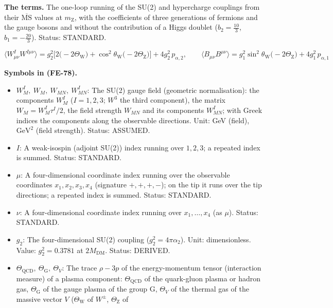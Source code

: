 \documentclass[
  10pt,
]{article}
\providecommand{\tightlist}{%
  \setlength{\itemsep}{0pt}\setlength{\parskip}{0pt}}
\begin{document}
\textbf{The terms.} The one-loop running of the SU(2) and hypercharge
couplings from their \(\overline{\mathrm{MS}}\) values at
\(m_{\mathrm{Z}}\), with the coefficients of three generations of
fermions and the gauge bosons and without the contribution of a Higgs
doublet (\(b_2 = \frac{10}{3}\), \(b_1 = -\frac{20}{3}\)). Status:
STANDARD.

\[
\big\langle W^I_{\mu\nu}W^{I\mu\nu}\big\rangle = g_2^2\Big[2\big(-2\Theta_{\mathrm{W}}\big)
 + \cos^2\theta_{\mathrm{W}}\big(-2\Theta_{\mathrm{Z}}\big)\Big] + 4g_2^2\,p_{\alpha,2},\qquad
\big\langle B_{\mu\nu}B^{\mu\nu}\big\rangle =
 g_1^2\sin^2\theta_{\mathrm{W}}\big(-2\Theta_{\mathrm{Z}}\big) + 4g_1^2\,p_{\alpha,1} \tag{FE-78}
\]

\textbf{Symbols in (FE-78).}

\begin{itemize}
\tightlist
\item
  \(W^I_M,\ W_M,\ W_{MN},\ W^I_{MN}\): The SU(2) gauge field (geometric
  normalisation): the components \(W^I_M\) (\(I = 1, 2, 3\); \(W^3\) the
  third component), the matrix \(W_M = W^I_M\tau^I/2\), the field
  strength \(W_{MN}\) and its components \(W^I_{MN}\); with Greek
  indices the components along the observable directions. Unit: GeV
  (field), \(\mathrm{GeV}^{2}\) (field strength). Status: ASSUMED.
\item
  \(I\): A weak-isospin (adjoint SU(2)) index running over \(1, 2, 3\);
  a repeated index is summed. Status: STANDARD.
\item
  \(\mu\): A four-dimensional coordinate index running over the
  observable coordinates \(x_1, x_2, x_3, x_4\) (signature \(+,+,+,-\));
  on the tip it runs over the tip directions; a repeated index is
  summed. Status: STANDARD.
\item
  \(\nu\): A four-dimensional coordinate index running over
  \(x_1, \dots, x_4\) (as \(\mu\)). Status: STANDARD.
\item
  \(g_2\): The four-dimensional SU(2) coupling
  (\(g_2^2 = 4\pi\alpha_2\)). Unit: dimensionless. Value:
  \(g_2^2 = 0.3781\) at \(2M_{\mathrm{DM}}\). Status: DERIVED.
\item
  \(\Theta_{\mathrm{QCD}},\ \Theta_{\mathrm{G}},\ \Theta_V\): The trace
  \(\rho - 3p\) of the energy-momentum tensor (interaction measure) of a
  plasma component: \(\Theta_{\mathrm{QCD}}\) of the quark-gluon plasma
  or hadron gas, \(\Theta_{\mathrm{G}}\) of the gauge plasma of the
  group G, \(\Theta_V\) of the thermal gas of the massive vector \(V\)
  (\(\Theta_{\mathrm{W}}\) of \(W^\pm\), \(\Theta_{\mathrm{Z}}\) of

\end{itemize}
\end{document}
